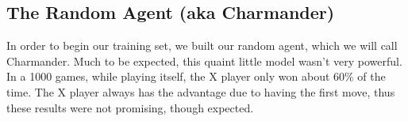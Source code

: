 
\subsection{The Random Agent (aka Charmander)}
In order to begin our training set, we built our random agent, which we will call Charmander.
Much to be expected, this quaint little model wasn't very powerful.
In a 1000 games, while playing itself, the X player only won about 60\% of the time.
The X player always has the advantage due to having the first move, thus these results were not promising, though expected.
